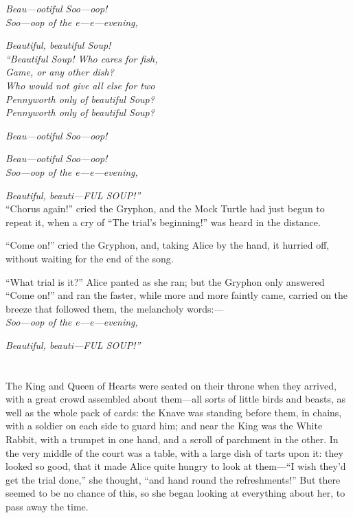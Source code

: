 \documentclass[book, 20pt]{extbook}
\begin{document}
\emph{Beau---ootiful Soo---oop!\\}
\noindent\emph{Soo---oop of the e---e---evening,\\}

\emph{Beautiful, beautiful Soup!\\}
\bigskip
\noindent\emph{``Beautiful Soup! Who cares for fish,\\}
\noindent\emph{Game, or any other dish?\\}
\noindent\emph{Who would not give all else for two\\}
\noindent\emph{Pennyworth only of beautiful Soup?\\}
\noindent\emph{Pennyworth only of beautiful Soup?\\}

\emph{Beau---ootiful Soo---oop!\\}

\emph{Beau---ootiful Soo---oop!\\}
\noindent\emph{Soo---oop of the e---e---evening,\\}

\emph{Beautiful, beauti---FUL SOUP!''\\}
\bigskip
``Chorus again!'' cried the Gryphon, and the Mock Turtle had just begun
to repeat it, when a cry of ``The trial's beginning!'' was heard in the
distance.

``Come on!'' cried the Gryphon, and, taking Alice by the hand, it
hurried off, without waiting for the end of the song.

``What trial is it?'' Alice panted as she ran; but the Gryphon only
answered ``Come on!'' and ran the faster, while more and more faintly
came, carried on the breeze that followed them, the melancholy words:---\\
\bigskip
\noindent\emph{Soo---oop of the e---e---evening,}

\emph{Beautiful, beauti---FUL SOUP!''\\}

\chapter*{}


The King and Queen of Hearts were seated on their throne when they
arrived, with a great crowd assembled about them---all sorts of little
birds and beasts, as well as the whole pack of cards: the Knave was
standing before them, in chains, with a soldier on each side to guard
him; and near the King was the White Rabbit, with a trumpet in one hand,
and a scroll of parchment in the other. In the very middle of the court
was a table, with a large dish of tarts upon it: they looked so good,
that it made Alice quite hungry to look at them---``I wish they'd get
the trial done,'' she thought, ``and hand round the refreshments!'' But
there seemed to be no chance of this, so she began looking at everything
about her, to pass away the time.
\end{document}
